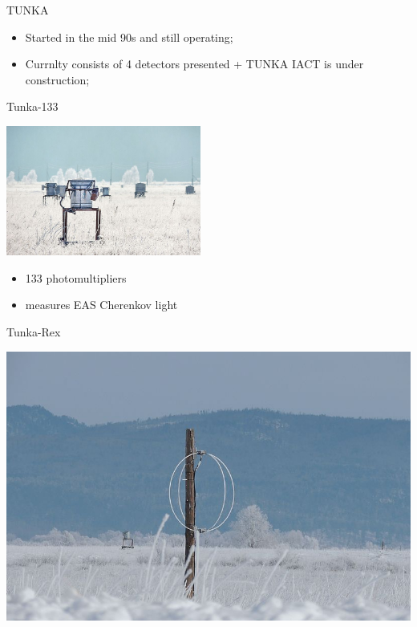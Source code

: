 \begin{frame}{TUNKA}
\footnotesize
\begin{itemize}
 \item Started in the mid 90s and still operating;
 \item Currnlty consists of 4 detectors presented + TUNKA IACT is under construction;
\end{itemize}
\vspace{-1em}
\begin{minipage}[t]{0.48\textwidth}
  \begin{block}{Tunka-133}
  \parbox{0.43\textwidth}{
    \centering
    \includegraphics[width=0.48\textwidth]{pics/Tunka-133.jpg}}
\parbox{0.55\textwidth}{
    \begin{itemize}
      \setlength{\itemsep}{0pt}
      \item 133 photomultipliers
      \item measures EAS Cherenkov light
    \end{itemize}
}
  \end{block}
\end{minipage}
\hfill
\begin{minipage}[t]{0.48\textwidth}
  \begin{block}{Tunka-Rex}
    \parbox{0.43\textwidth}{
        \centering
        \includegraphics[height=0.22\textheight]{pics/Tunka-Rex.jpg}
}
\end{block}
\end{minipage}
\end{frame}
